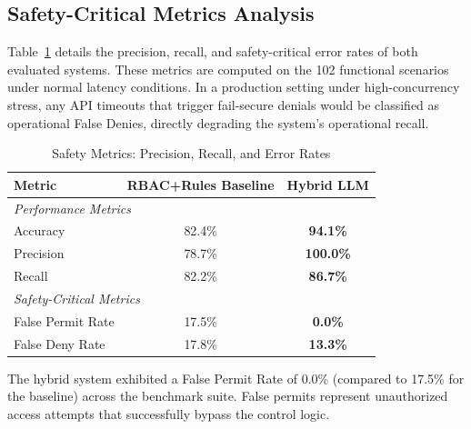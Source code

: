 \documentclass[
]{ceurart}
\begin{document}
\subsection{Safety-Critical Metrics Analysis}\label{sec:safety_metrics}

Table~\ref{tab:safety_metrics} details the precision, recall, and safety-critical error rates of both evaluated systems. These metrics are computed on the 102 functional scenarios under normal latency conditions. In a production setting under high-concurrency stress, any API timeouts that trigger fail-secure denials would be classified as operational False Denies, directly degrading the system's operational recall.

\begin{table}[htbp]
    \centering
    \caption{Safety Metrics: Precision, Recall, and Error Rates}
    \label{tab:safety_metrics}
    \begin{tabular}{lcc}
        \toprule
        \textbf{Metric}   & \textbf{RBAC+Rules Baseline} & \textbf{Hybrid LLM} \\
        \midrule
        \multicolumn{3}{l}{\textit{Performance Metrics}}                 \\
        Accuracy          & 82.4\%                 & \textbf{94.1\%}     \\
        Precision         & 78.7\%                 & \textbf{100.0\%}    \\
        Recall            & 82.2\%                 & \textbf{86.7\%}     \\
        \midrule
        \multicolumn{3}{l}{\textit{Safety-Critical Metrics}}             \\
        False Permit Rate & 17.5\%                 & \textbf{0.0\%}      \\
        False Deny Rate   & 17.8\%                 & \textbf{13.3\%}     \\
        \bottomrule
    \end{tabular}
\end{table}

The hybrid system exhibited a False Permit Rate of 0.0\% (compared to 17.5\% for the baseline) across the benchmark suite. False permits represent unauthorized access attempts that successfully bypass the control logic.
\end{document}
